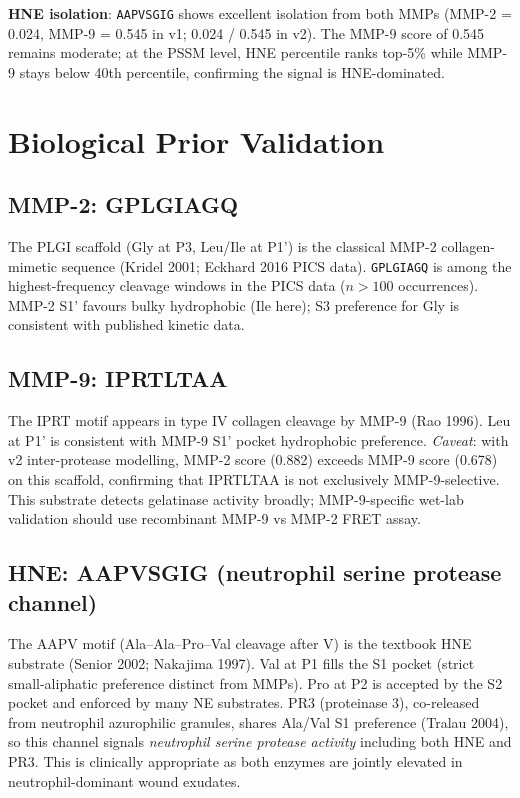 \documentclass[10pt,a4paper]{article}
\newcommand{\seq}[1]{\texttt{#1}}
\begin{document}
\textbf{HNE isolation}: \seq{AAPVSGIG} shows excellent isolation from both
MMPs (MMP-2 = 0.024, MMP-9 = 0.545 in v1; 0.024 / 0.545 in v2).  The
MMP-9 score of 0.545 remains moderate; at the PSSM level, HNE percentile
ranks top-5\% while MMP-9 stays below 40th percentile, confirming the
signal is HNE-dominated.

\section{Biological Prior Validation}

\subsection{MMP-2: GPLGIAGQ}

The PLGI scaffold (Gly at P3, Leu/Ile at P1') is the classical MMP-2
collagen-mimetic sequence (Kridel 2001; Eckhard 2016 PICS data).
\seq{GPLGIAGQ} is among the highest-frequency cleavage windows in the
PICS data ($n > 100$ occurrences).  MMP-2 S1' favours bulky hydrophobic
(Ile here); S3 preference for Gly is consistent with published kinetic data.

\subsection{MMP-9: IPRTLTAA}

The IPRT motif appears in type IV collagen cleavage by MMP-9 (Rao 1996).
Leu at P1' is consistent with MMP-9 S1' pocket hydrophobic preference.
\textit{Caveat}: with v2 inter-protease modelling, MMP-2 score (0.882)
exceeds MMP-9 score (0.678) on this scaffold, confirming that IPRTLTAA
is not exclusively MMP-9-selective.  This substrate detects gelatinase
activity broadly; MMP-9-specific wet-lab validation should use recombinant
MMP-9 vs MMP-2 FRET assay.

\subsection{HNE: AAPVSGIG (neutrophil serine protease channel)}

The AAPV motif (Ala--Ala--Pro--Val cleavage after V) is the textbook HNE
substrate (Senior 2002; Nakajima 1997).  Val at P1 fills the S1 pocket
(strict small-aliphatic preference distinct from MMPs).  Pro at P2 is
accepted by the S2 pocket and enforced by many NE substrates.  PR3
(proteinase 3), co-released from neutrophil azurophilic granules, shares
Ala/Val S1 preference (Tralau 2004), so this channel signals \emph{neutrophil
serine protease activity} including both HNE and PR3.  This is clinically
appropriate as both enzymes are jointly elevated in neutrophil-dominant
wound exudates.
\end{document}
